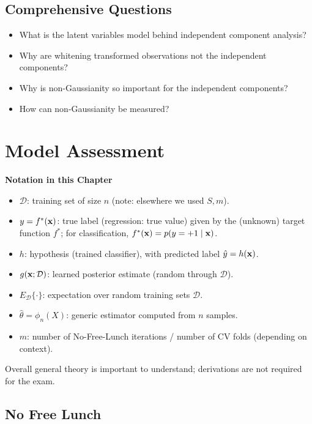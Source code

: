 \subsection{Comprehensive Questions}

  \begin{itemize}
    \item What is the latent variables model behind independent component analysis?         
    \item Why are whitening transformed observations not the independent components?      \item Why is non-Gaussianity so important for the independent components?         
    \item How can non-Gaussianity be measured?
  \end{itemize}
          

\def\PS{{\mathop{\mathsf{PS}}}}
\newpage 
\section{Model Assessment}\autocite{duda2001,hastie2009,sawyer2005}

\textbf{Notation in this Chapter}\\
{\small
\begin{itemize}
  \item $\mathcal D$: training set of size $n$ (note: elsewhere we used $S,m$).
  \item $y=f^*(\bm{\mathrm{x}})$: true label (regression: true value) given by the (unknown) target function $f^*$; for classification, $f^*(\bm{\mathrm{x}})=p(y=+1\mid\bm{\mathrm{x}})$.
  \item $h$: hypothesis (trained classifier), with predicted label $\hat y=h(\bm{\mathrm{x}})$.
  \item $g(\bm{\mathrm{x}};\mathcal D)$: learned posterior estimate (random through $\mathcal D$).
  \item $E_{\mathcal D}\{\cdot\}$: expectation over random training sets $\mathcal D$.
  \item $\hat\theta=\phi_n(X)$: generic estimator computed from $n$ samples.
  \item $m$: number of No-Free-Lunch iterations / number of CV folds (depending on context).
\end{itemize}
}

Overall general theory is important to understand; derivations are not required for the exam.

\subsection{No Free Lunch}

